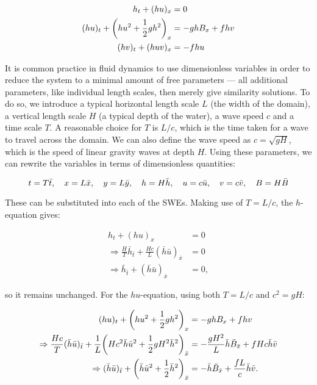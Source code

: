 \begin{subequations}
  \label{eq:swe}
  \begin{align}
                           h_t + (hu)_x & = 0 \\
    (hu)_t + \qty(hu^2 + \frac{1}{2}gh^2)_x & = - ghB_x + fhv \\
                       (hv)_t + (huv)_x & = - fhu
  \end{align}
\end{subequations}

It is common practice in fluid dynamics to use dimensionless variables in order to reduce the system to a minimal amount of free parameters --- all additional parameters, like individual length scales, then merely give similarity solutions. To do so, we introduce a typical horizontal length scale $L$ (the width of the domain), a vertical length scale $H$ (a typical depth of the water), a wave speed $c$ and a time scale $T$. A reasonable choice for $T$ is $L/c$, which is the time taken for a wave to travel across the domain. We can also define the wave speed as $c = \sqrt{gH}$, which is the speed of linear gravity waves at depth $H$. Using these parameters, we can rewrite the variables in terms of dimensionless quantities:

\begin{equation}
  t = T\bar t\qc x = L\bar x\qc y = L\bar y\qc h = H\bar h\qc u = c\bar u\qc v = c\bar v\qc B = H\bar B \label{eq:scaling}
\end{equation}

These can be substituted into each of the SWEs. Making use of $T = L/c$, the $h$-equation gives:


\begin{align}
  h_t + (hu)_x & = 0 \\
  \Rightarrow \frac{H}{T} \bar h_{\bar t} + \frac{Hc}{L} (\bar h \bar u)_{\bar x} & = 0 \\
  \Rightarrow \bar h_{\bar t} + (\bar h \bar u)_{\bar x} & = 0,
\end{align}

so it remains unchanged. For the $hu$-equation, using both $T = L/c$ and $c^2 = gH$:

\begin{align}
  (hu)_t + \qty(hu^2 + \frac{1}{2}gh^2)_x & = - ghB_x + fhv \\
  \Rightarrow \frac{Hc}{T}(\bar h\bar u)_{\bar t} + \frac{1}{L}\qty(Hc^2 \bar h\bar u^2 + \frac{1}{2}gH^2\bar h^2)_{\bar x} & = - \frac{gH^2}{L}\bar h\bar B_{\bar x} + fHc\bar h\bar v \\
  \Rightarrow (\bar h\bar u)_{\bar t} + \qty(\bar h\bar u^2 + \frac{1}{2} \bar h^2)_{\bar x} & = - \bar h\bar B_{\bar x} + \frac{fL}{c}\bar h\bar v.
\end{align}

